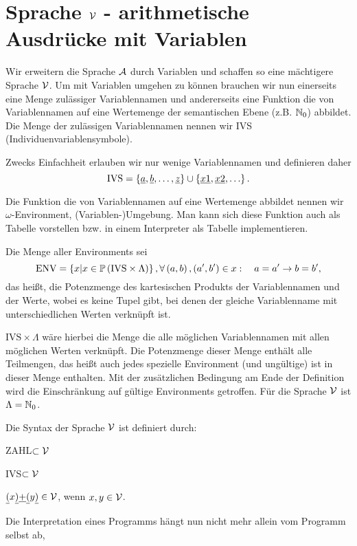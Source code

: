 \section{Sprache $\mathcal{V}$ - arithmetische Ausdrücke mit Variablen}
Wir erweitern die Sprache $\mathcal{A}$ durch Variablen und schaffen so eine mächtigere Sprache $\mathcal{V}$.
Um mit Variablen umgehen zu können brauchen wir nun einerseits eine Menge zulässiger
Variablennamen und andererseits eine Funktion die von Variablennamen auf eine Wertemenge der semantischen Ebene (z.B. $\mathbb{N}_0$) abbildet.
Die Menge der zulässigen Variablennamen nennen wir IVS (Individuenvariablensymbole).
\begin{defn}
Zwecks Einfachheit erlauben wir nur wenige Variablennamen und definieren daher
\[\text{IVS} = \left\{\underline{a},\underline{b},\ldots,\underline{z}\right\} \cup \left\{\underline{x1},\underline{x2},\ldots\right\}.\]
\end{defn}
Die Funktion die von Variablennamen auf eine Wertemenge abbildet nennen wir $\omega$-Environment, (Variablen-)Umgebung.
Man kann sich diese Funktion auch als Tabelle vorstellen bzw. in einem Interpreter als Tabelle implementieren.
\begin{defn}
Die Menge aller Environments sei
\[\text{ENV} = \left\{x | x \in \mathbb{P}\left(\text{IVS} \times \Lambda\right)\right\}, \forall \left(a,b\right),\left(a',b'\right) \in x : \quad a = a' \to b = b',\]
das heißt, die Potenzmenge des kartesischen Produkts der Variablennamen und der Werte, wobei es keine Tupel gibt, bei denen der gleiche Variablenname mit unterschiedlichen Werten verknüpft ist.
\end{defn}
$\text{IVS} \times \Lambda$ wäre hierbei die Menge die alle möglichen Variablennamen mit allen möglichen Werten verknüpft. Die Potenzmenge dieser Menge enthält alle Teilmengen, das heißt auch jedes spezielle Environment (und ungültige) ist in dieser Menge enthalten. Mit der zusätzlichen Bedingung am Ende der Definition wird die Einschränkung auf gültige Environments getroffen.
Für die Sprache $\mathcal{V}$ ist $\Lambda=\mathbb{N}_0$.
\begin{defn}
Die Syntax der Sprache $\mathcal{V}$ ist definiert durch:
\begin{\whichenum}
\item ZAHL$\subset \mathcal{V}$
\item IVS$\subset \mathcal{V}$
\item $\underline{(} x \underline{)} \underline{+} \underline{(} y \underline{)} \in \mathcal{V}$, wenn $x,y \in \mathcal{V}$.
\end{\whichenum}
\end{defn}
Die Interpretation eines Programms hängt nun nicht mehr allein vom Programm selbst ab,
